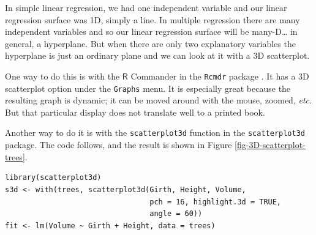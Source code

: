 \documentclass[captions=tableheading]{scrbook}
\begin{document}
In simple linear regression, we had one independent variable and our linear regression surface was 1D, simply a line. In multiple regression there are many independent variables and so our linear regression surface will be many-D\ldots{} in general, a hyperplane. But when there are only two explanatory variables the hyperplane is just an ordinary plane and we can look at it with a 3D scatterplot. 

One way to do this is with the \(\mathsf{R}\) Commander in the \texttt{Rcmdr} package \cite{Foxrcmdr}. It has a 3D scatterplot option under the \texttt{Graphs} menu. It is especially great because the resulting graph is dynamic; it can be moved around with the mouse, zoomed, \emph{etc}. But that particular display does not translate well to a printed book.

Another way to do it is with the \texttt{scatterplot3d} function in the \texttt{scatterplot3d} package. The code follows, and the result is shown in Figure \ref{fig-3D-scatterplot-trees}.


\begin{verbatim}
library(scatterplot3d)
s3d <- with(trees, scatterplot3d(Girth, Height, Volume, 
                                 pch = 16, highlight.3d = TRUE, 
                                 angle = 60))
fit <- lm(Volume ~ Girth + Height, data = trees)
\end{verbatim}
\end{document}
